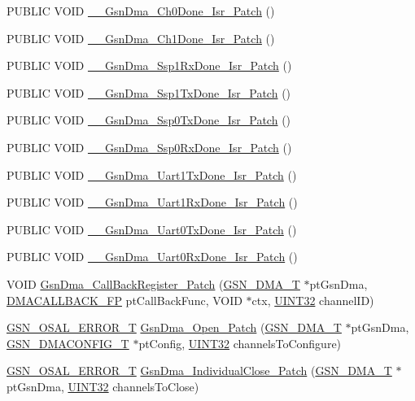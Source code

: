 \begin{DoxyCompactItemize}
\item 
PUBLIC VOID \hyperlink{a00484_ae4c2a112409c180c12ff5baa9e1998d6}{\_\-\_\-GsnDma\_\-Ch0Done\_\-Isr\_\-Patch} ()
\item 
PUBLIC VOID \hyperlink{a00484_a88cfbe6f9017bd8dddc8ac101a121f5c}{\_\-\_\-GsnDma\_\-Ch1Done\_\-Isr\_\-Patch} ()
\item 
PUBLIC VOID \hyperlink{a00484_ab678611bd82e54daf2d3f68a20e8a3b8}{\_\-\_\-GsnDma\_\-Ssp1RxDone\_\-Isr\_\-Patch} ()
\item 
PUBLIC VOID \hyperlink{a00484_a038161283be57b45e123d2c3d9ecf4be}{\_\-\_\-GsnDma\_\-Ssp1TxDone\_\-Isr\_\-Patch} ()
\item 
PUBLIC VOID \hyperlink{a00484_acace99d835a7aef998e611ad74255cbb}{\_\-\_\-GsnDma\_\-Ssp0TxDone\_\-Isr\_\-Patch} ()
\item 
PUBLIC VOID \hyperlink{a00484_a30def8295f750bd967af813f5ecc7fc7}{\_\-\_\-GsnDma\_\-Ssp0RxDone\_\-Isr\_\-Patch} ()
\item 
PUBLIC VOID \hyperlink{a00484_a5950124ebf8cfdb3d07d14ea818e732a}{\_\-\_\-GsnDma\_\-Uart1TxDone\_\-Isr\_\-Patch} ()
\item 
PUBLIC VOID \hyperlink{a00484_a23c5bed5fe1e54dc8d9660a584fc806b}{\_\-\_\-GsnDma\_\-Uart1RxDone\_\-Isr\_\-Patch} ()
\item 
PUBLIC VOID \hyperlink{a00484_a148c3dbf8d37a1d8c2db90e56af9f4d8}{\_\-\_\-GsnDma\_\-Uart0TxDone\_\-Isr\_\-Patch} ()
\item 
PUBLIC VOID \hyperlink{a00484_a2143cff0f132766e5979a15e701bf1be}{\_\-\_\-GsnDma\_\-Uart0RxDone\_\-Isr\_\-Patch} ()
\item 
VOID \hyperlink{a00484_a60ba6c03d23e0f88788bedba719983b7}{GsnDma\_\-CallBackRegister\_\-Patch} (\hyperlink{a00049}{GSN\_\-DMA\_\-T} $\ast$ptGsnDma, \hyperlink{a00484_a74d23c3cb3acf00134600795aef55b6e}{DMACALLBACK\_\-FP} ptCallBackFunc, VOID $\ast$ctx, \hyperlink{a00660_gae1e6edbbc26d6fbc71a90190d0266018}{UINT32} channelID)
\item 
\hyperlink{a00659_ga36216a7aacd1d5024bc7b8bf39c3f46b}{GSN\_\-OSAL\_\-ERROR\_\-T} \hyperlink{a00484_a9fe7978fe38826e94cb78c3e964f04cb}{GsnDma\_\-Open\_\-Patch} (\hyperlink{a00049}{GSN\_\-DMA\_\-T} $\ast$ptGsnDma, \hyperlink{a00053}{GSN\_\-DMACONFIG\_\-T} $\ast$ptConfig, \hyperlink{a00660_gae1e6edbbc26d6fbc71a90190d0266018}{UINT32} channelsToConfigure)
\item 
\hyperlink{a00659_ga36216a7aacd1d5024bc7b8bf39c3f46b}{GSN\_\-OSAL\_\-ERROR\_\-T} \hyperlink{a00484_a0bec5573e11fbfdd444b02d1c787dcba}{GsnDma\_\-IndividualClose\_\-Patch} (\hyperlink{a00049}{GSN\_\-DMA\_\-T} $\ast$ptGsnDma, \hyperlink{a00660_gae1e6edbbc26d6fbc71a90190d0266018}{UINT32} channelsToClose)
\end{DoxyCompactItemize}


